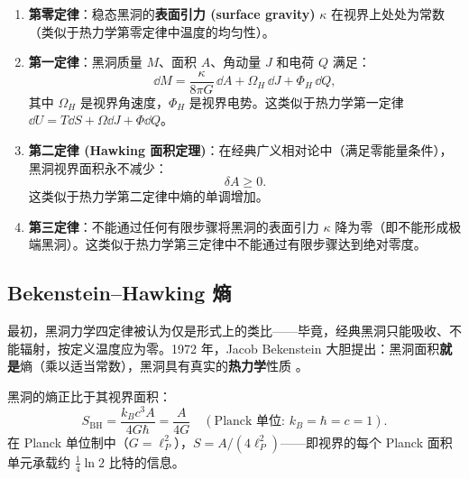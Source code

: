 \begin{theorem}[黑洞力学四定律]
\label{thm:four_laws}
\begin{enumerate}
    \item \textbf{第零定律}：稳态黑洞的\textbf{表面引力 (surface gravity)} $\kappa$ 在视界上处处为常数（类似于热力学第零定律中温度的均匀性）。
    
    \item \textbf{第一定律}：黑洞质量 $M$、面积 $A$、角动量 $J$ 和电荷 $Q$ 满足：
    \begin{equation}
        \boxed{\dd M = \frac{\kappa}{8\pi G}\,\dd A + \Omega_H\,\dd J + \Phi_H\,\dd Q},
        \label{eq:first_law}
    \end{equation}
    其中 $\Omega_H$ 是视界角速度，$\Phi_H$ 是视界电势。这类似于热力学第一定律 $\dd U = T\dd S + \Omega\dd J + \Phi\dd Q$。
    
    \item \textbf{第二定律 (Hawking 面积定理)}：在经典广义相对论中（满足零能量条件），黑洞视界面积永不减少：
    \begin{equation}
        \boxed{\delta A \geq 0}.
        \label{eq:area_theorem}
    \end{equation}
    这类似于热力学第二定律中熵的单调增加。
    
    \item \textbf{第三定律}：不能通过任何有限步骤将黑洞的表面引力 $\kappa$ 降为零（即不能形成极端黑洞）。这类似于热力学第三定律中不能通过有限步骤达到绝对零度。
\end{enumerate}
\end{theorem}

\subsection{Bekenstein–Hawking 熵}

最初，黑洞力学四定律被认为仅是形式上的类比——毕竟，经典黑洞只能吸收、不能辐射，按定义温度应为零。1972 年，Jacob Bekenstein 大胆提出：黑洞面积\textbf{就是}熵（乘以适当常数），黑洞具有真实的\textbf{热力学}性质 \cite{Wald1984}。

\begin{theorem}
黑洞的熵正比于其视界面积：
\begin{equation}
    \boxed{S_{\text{BH}} = \frac{k_B c^3 A}{4G\hbar} = \frac{A}{4G} \quad (\text{Planck 单位: } k_B = \hbar = c = 1)}.
    \label{eq:BH_entropy}
\end{equation}
在 Planck 单位制中（$G = \ell_P^2$），$S = A/(4\ell_P^2)$——即视界的每个 Planck 面积单元承载约 $\frac{1}{4}\ln 2$ 比特的信息。
\end{theorem}

